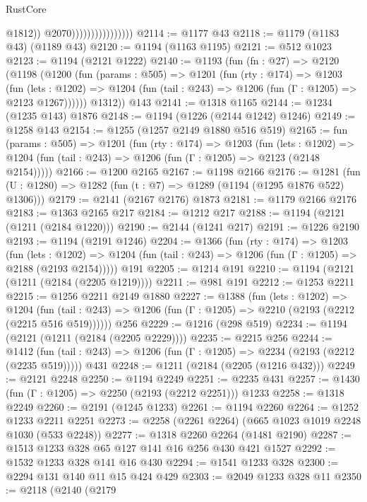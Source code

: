 \begin{lexlean}{RustCore}
\begin{coremodule}
                                        @1812))
                                    @2070))))))))))))))))
@2114 := @1177 @43
@2118 := @1179 (@1183 @43) (@1189 @43)
@2120 := @1194 (@1163 @1195)
@2121 := @512 @1023
@2123 := @1194 (@2121 @1222)
@2140 := @1193
    (fun (fn : @27) =>
    @2120
      (@1198
        (@1200
          (fun (params : @505) =>
          @1201
            (fun (rty : @174) =>
            @1203
              (fun (lets : @1202) =>
              @1204 (fun (tail : @243) => @1206 (fun (Γ : @1205) => @2123 @1267))))))
        @1312))
    @143
@2141 := @1318 @1165
@2144 := @1234 (@1235 @143) @1876
@2148 := @1194 (@1226 (@2144 @1242) @1246)
@2149 := @1258 @143
@2154 := @1255 (@1257 @2149 @1880 @516 @519)
@2165 := fun (params : @505) =>
  @1201
    (fun (rty : @174) =>
    @1203
      (fun (lets : @1202) =>
      @1204 (fun (tail : @243) => @1206 (fun (Γ : @1205) => @2123 (@2148 @2154)))))
@2166 := @1200 @2165
@2167 := @1198 @2166
@2176 := @1281 (fun (U : @1280) => @1282 (fun (t : @7) => @1289 (@1194 (@1295 @1876 @522) @1306)))
@2179 := @2141 (@2167 @2176) @1873
@2181 := @1179 @2166 @2176
@2183 := @1363 @2165 @217
@2184 := @1212 @217
@2188 := @1194 (@2121 (@1211 (@2184 @1220)))
@2190 := @2144 (@1241 @217)
@2191 := @1226 @2190
@2193 := @1194 (@2191 @1246)
@2204 := @1366
    (fun (rty : @174) =>
    @1203
      (fun (lets : @1202) =>
      @1204 (fun (tail : @243) => @1206 (fun (Γ : @1205) => @2188 (@2193 @2154)))))
    @191
@2205 := @1214 @191
@2210 := @1194 (@2121 (@1211 (@2184 (@2205 @1219))))
@2211 := @981 @191
@2212 := @1253 @2211
@2215 := @1256 @2211 @2149 @1880
@2227 := @1388
    (fun (lets : @1202) =>
    @1204 (fun (tail : @243) => @1206 (fun (Γ : @1205) => @2210 (@2193 (@2212 (@2215 @516 @519))))))
    @256
@2229 := @1216 (@298 @519)
@2234 := @1194 (@2121 (@1211 (@2184 (@2205 @2229))))
@2235 := @2215 @256
@2244 := @1412
    (fun (tail : @243) => @1206 (fun (Γ : @1205) => @2234 (@2193 (@2212 (@2235 @519)))))
    @431
@2248 := @1211 (@2184 (@2205 (@1216 @432)))
@2249 := @2121 @2248
@2250 := @1194 @2249
@2251 := @2235 @431
@2257 := @1430 (fun (Γ : @1205) => @2250 (@2193 (@2212 @2251))) @1233
@2258 := @1318 @2249
@2260 := @2191 (@1245 @1233)
@2261 := @1194 @2260
@2264 := @1252 @1233 @2211 @2251
@2273 := @2258 (@2261 @2264) (@665 @1023 @1019 @2248 @1030 (@533 @2248))
@2277 := @1318 @2260 @2264 (@1481 @2190)
@2287 := @1513 @1233 @328 @65 @127 @141 @16 @256 @430 @421 @1527
@2292 := @1532 @1233 @328 @141 @16 @430
@2294 := @1541 @1233 @328
@2300 := @2294 @131 @140 @11 @15 @424 @429
@2303 := @2049 @1233 @328 @11
@2350 := @2118
    (@2140
      (@2179

\end{coremodule}
\end{lexlean}
